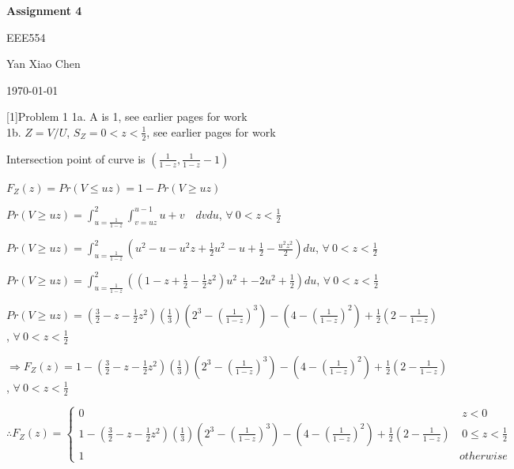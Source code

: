 \documentclass{article} %
\newcommand{\question}[2][]{\begin{flushleft}
        \textbf{Question #1}: \textit{#2}

\end{flushleft}}
\newcommand{\maketitletwo}[2][]{\begin{center}
        \Large{\textbf{Assignment #1}
            
            EEE554} %
        \vspace{5pt}
        
        \normalsize{Yan Xiao Chen  %
        
        \today}        %
        \vspace{15pt}
        
\end{center}}
\begin{document}
    \maketitletwo[4]  %

    \question[1]{Problem 1} 
    1a. A is 1, see earlier pages for work \\
    1b. $Z = V/U$, $S_Z=0 < z < \frac{1}{2}$, see earlier pages for work

    Intersection point of curve is $(\frac{1}{1-z},\frac{1}{1-z}-1)$
    
    $F_Z(z)=Pr(V \leq uz)= 1 - Pr(V \geq uz)$

    $Pr(V \geq uz)=\int_{u=\frac{1}{1-z}}^{2} \int_{v=uz}^{u-1}u+v \quad dv du$, $\forall \ 0<z<\frac{1}{2}$

    $Pr(V \geq uz)=\int_{u=\frac{1}{1-z}}^{2}(u^2-u-u^2z+\frac{1}{2}u^2-u+\frac{1}{2}-\frac{u^2z^2}{2})du$, $\forall \ 0<z<\frac{1}{2}$

    $Pr(V \geq uz)=\int_{u=\frac{1}{1-z}}^{2}((1-z+\frac{1}{2}-\frac{1}{2}z^2)u^2+-2u^2+\frac{1}{2})du$, $\forall \ 0<z<\frac{1}{2}$

    $Pr(V \geq uz)=(\frac{3}{2}-z-\frac{1}{2}z^2)(\frac{1}{3})(2^3-(\frac{1}{1-z})^3)-(4-(\frac{1}{1-z})^2)+\frac{1}{2}(2-\frac{1}{1-z})$, $\forall \ 0<z<\frac{1}{2}$
    
    $\Rightarrow F_Z(z)=1-(\frac{3}{2}-z-\frac{1}{2}z^2)(\frac{1}{3})(2^3-(\frac{1}{1-z})^3)-(4-(\frac{1}{1-z})^2)+\frac{1}{2}(2-\frac{1}{1-z})$, $\forall \ 0<z<\frac{1}{2}$

    $\therefore F_Z(z) = \left\{ \begin{array}{cl}
        0  &  \ z < 0 \\
        1-(\frac{3}{2}-z-\frac{1}{2}z^2)(\frac{1}{3})(2^3-(\frac{1}{1-z})^3)-(4-(\frac{1}{1-z})^2)+\frac{1}{2}(2-\frac{1}{1-z}) &  \ 0 \leq z < \frac{1}{2} \\
        1  &  otherwise 
        \end{array} \right.$
    
\end{document}
